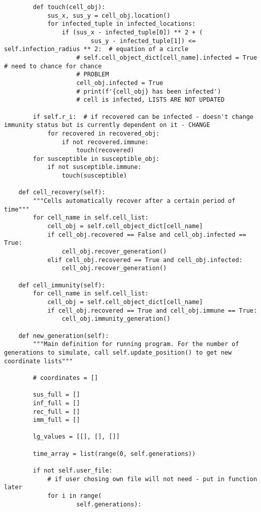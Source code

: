 \documentclass[11pt, a4paper]{article}
\begin{document}
\begin{lstlisting}
        def touch(cell_obj):
            sus_x, sus_y = cell_obj.location()
            for infected_tuple in infected_locations:
                if (sus_x - infected_tuple[0]) ** 2 + (
                        sus_y - infected_tuple[1]) <= self.infection_radius ** 2:  # equation of a circle
                    # self.cell_object_dict[cell_name].infected = True  # need to chance for chance
                    # PROBLEM
                    cell_obj.infected = True
                    # print(f'{cell_obj} has been infected')
                    # cell is infected, LISTS ARE NOT UPDATED

        if self.r_i:  # if recovered can be infected - doesn't change immunity status but is currently dependent on it - CHANGE
            for recovered in recovered_obj:
                if not recovered.immune:
                    touch(recovered)
        for susceptible in susceptible_obj:
            if not susceptible.immune:
                touch(susceptible)

    def cell_recovery(self):
        """Cells automatically recover after a certain period of time"""
        for cell_name in self.cell_list:
            cell_obj = self.cell_object_dict[cell_name]
            if cell_obj.recovered == False and cell_obj.infected == True:
                cell_obj.recover_generation()
            elif cell_obj.recovered == True and cell_obj.infected:
                cell_obj.recover_generation()

    def cell_immunity(self):
        for cell_name in self.cell_list:
            cell_obj = self.cell_object_dict[cell_name]
            if cell_obj.recovered == True and cell_obj.immune == True:
                cell_obj.immunity_generation()

    def new_generation(self):
        """Main definition for running program. For the number of generations to simulate, call self.update_position() to get new coordinate lists"""

        # coordinates = []

        sus_full = []
        inf_full = []
        rec_full = []
        imm_full = []

        lg_values = [[], [], []]

        time_array = list(range(0, self.generations))

        if not self.user_file:
            # if user chosing own file will not need - put in function later
            for i in range(
                    self.generations):


\end{lstlisting}
\end{document}
